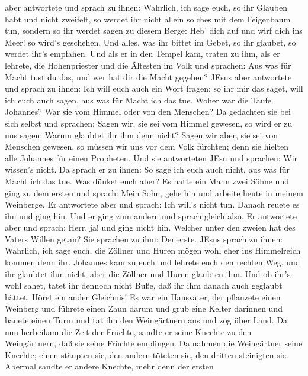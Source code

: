 aber antwortete und sprach zu ihnen: Wahrlich, ich sage euch, so ihr
Glauben habt und nicht zweifelt, so werdet ihr nicht allein solches mit
dem Feigenbaum tun, sondern so ihr werdet sagen zu diesem Berge: Heb'
dich auf und wirf dich ins Meer! so wird's geschehen.  Und
alles, was ihr bittet im Gebet, so ihr glaubet, so werdet ihr's
empfahen.  Und als er in den Tempel kam, traten zu ihm, als
er lehrete, die Hohenpriester und die Ältesten im Volk und sprachen: Aus
was für Macht tust du das, und wer hat dir die Macht gegeben?
 JEsus aber antwortete und sprach zu ihnen: Ich will euch
auch ein Wort fragen; so ihr mir das saget, will ich euch auch sagen,
aus was für Macht ich das tue.  Woher war die Taufe
Johannes? War sie vom Himmel oder von den Menschen? Da gedachten sie bei
sich selbst und sprachen: Sagen wir, sie sei vom Himmel gewesen, so wird
er zu uns sagen: Warum glaubtet ihr ihm denn nicht?  Sagen
wir aber, sie sei von Menschen gewesen, so müssen wir uns vor dem Volk
fürchten; denn sie hielten alle Johannes für einen Propheten.
 Und sie antworteten JEsu und sprachen: Wir wissen's nicht.
Da sprach er zu ihnen: So sage ich euch auch nicht, aus was für Macht
ich das tue.  Was dünket euch aber? Es hatte ein Mann zwei
Söhne und ging zu dem ersten und sprach: Mein Sohn, gehe hin und arbeite
heute in meinem Weinberge.  Er antwortete aber und sprach:
Ich will's nicht tun. Danach reuete es ihn und ging hin. 
Und er ging zum andern und sprach gleich also. Er antwortete aber und
sprach: Herr, ja! und ging nicht hin.  Welcher unter den
zweien hat des Vaters Willen getan? Sie sprachen zu ihm: Der erste.
JEsus sprach zu ihnen: Wahrlich, ich sage euch, die Zöllner und Huren
mögen wohl eher ins Himmelreich kommen denn ihr.  Johannes
kam zu euch und lehrete euch den rechten Weg, und ihr glaubtet ihm
nicht; aber die Zöllner und Huren glaubten ihm. Und ob ihr's wohl sahet,
tatet ihr dennoch nicht Buße, daß ihr ihm danach auch geglaubt hättet.
 Höret ein ander Gleichnis! Es war ein Hausvater, der
pflanzete einen Weinberg und führete einen Zaun darum und grub eine
Kelter darinnen und bauete einen Turm und tat ihn den Weingärtnern aus
und zog über Land.  Da nun herbeikam die Zeit der Früchte,
sandte er seine Knechte zu den Weingärtnern, daß sie seine Früchte
empfingen.  Da nahmen die Weingärtner seine Knechte; einen
stäupten sie, den andern töteten sie, den dritten steinigten sie.
 Abermal sandte er andere Knechte, mehr denn der ersten
